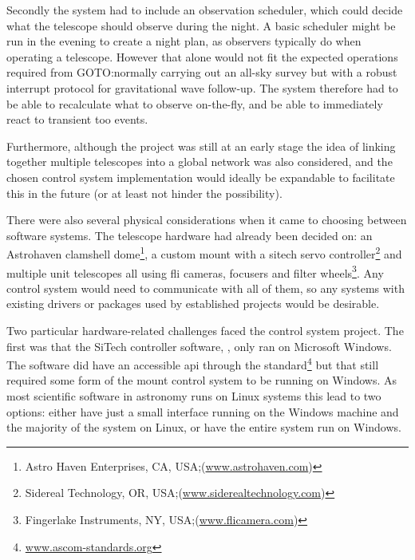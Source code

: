 \begin{colsection}
\begin{colsection}
Secondly the system had to include an observation scheduler, which could decide what the telescope should observe during the night. A basic scheduler might be run in the evening to create a night plan, as observers typically do when operating a telescope. However that alone would not fit the expected operations required from GOTO:\@ normally carrying out an all-sky survey but with a robust interrupt protocol for gravitational wave follow-up. The system therefore had to be able to recalculate what to observe on-the-fly, and be able to immediately react to transient \gls{too} events.

Furthermore, although the project was still at an early stage the idea of linking together multiple telescopes into a global network was also considered, and the chosen control system implementation would ideally be expandable to facilitate this in the future (or at least not hinder the possibility).

There were also several physical considerations when it came to choosing between software systems. The telescope hardware had already been decided on: an Astrohaven clamshell dome\footnote{Astro Haven Enterprises, CA, USA;\@ (\url{www.astrohaven.com})}, a custom mount with a \gls{sitech} servo controller\footnote{Sidereal Technology, OR, USA;\@ (\url{www.siderealtechnology.com})} and multiple unit telescopes all using \gls{fli} cameras, focusers and filter wheels\footnote{Fingerlake Instruments, NY, USA;\@ (\url{www.flicamera.com})}. Any control system would need to communicate with all of them, so any systems with existing drivers or packages used by established projects would be desirable. 

Two particular hardware-related challenges faced the control system project. The first was that the SiTech controller software, , only ran on Microsoft Windows. The software did have an accessible \gls{api} through the  standard\footnote{\url{www.ascom-standards.org}} but that still required some form of the mount control system to be running on Windows. As most scientific software in astronomy runs on Linux systems this lead to two options: either have just a small interface running on the Windows machine and the majority of the system on Linux, or have the entire system run on Windows.


\end{colsection}
\end{colsection}
